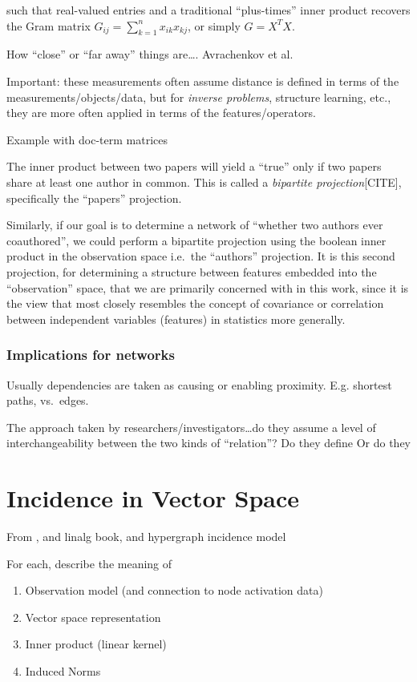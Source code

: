 \documentclass[%
	12pt,
		oneside,
		letterpaper
]{book}
\providecommand{\tightlist}{%
  \setlength{\itemsep}{0pt}\setlength{\parskip}{0pt}}\usepackage{longtable,booktabs,array}
\begin{document}
such that real-valued entries and a traditional ``plus-times'' inner
product recovers the Gram matrix \(G_{ij}=\sum_{k=1}^{n} x_{ik}x_{kj}\),
or simply \(G=X^TX\).

How ``close'' or ``far away'' things are\ldots. Avrachenkov et al.~

Important: these measurements often assume distance is defined in terms
of the measurements/objects/data, but for \emph{inverse problems},
structure learning, etc., they are more often applied in terms of the
features/operators.

Example with doc-term matrices

The inner product between two papers will yield a ``true'' only if two
papers share at least one author in common. This is called a
\emph{bipartite projection}{[}CITE{]}, specifically the ``papers''
projection.

Similarly, if our goal is to determine a network of ``whether two
authors ever coauthored'', we could perform a bipartite projection using
the boolean inner product in the observation space i.e.~the ``authors''
projection. It is this second projection, for determining a structure
between features embedded into the ``observation'' space, that we are
primarily concerned with in this work, since it is the view that most
closely resembles the concept of covariance or correlation between
independent variables (features) in statistics more generally.

\subsection{Implications for networks}\label{implications-for-networks}

Usually dependencies are taken as causing or enabling proximity. E.g.
shortest paths, vs.~edges.

The approach taken by researchers/investigators\ldots do they assume a
level of interchangeability between the two kinds of ``relation''? Do
they define Or do they

\chapter{Incidence in Vector Space}\label{incidence-in-vector-space}

From \autocite{WhyHowWhen_Torres2021}, and linalg book, and hypergraph
incidence model

For each, describe the meaning of

\begin{enumerate}
\def\labelenumi{\arabic{enumi}.}
\tightlist
\item
  Observation model (and connection to node activation data)
\item
  Vector space representation
\item
  Inner product (linear kernel)
\item
  Induced Norms
\end{enumerate}
\end{document}
